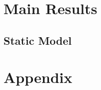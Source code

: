 \documentclass[aspectratio=169]{beamer}
\begin{document}
\section{Main Results}

\subsection{Static Model}
\begin{frame}
    \resizebox{30mm}{30mm}{
    }
\end{frame}



\appendix

\renewcommand\thetable{\thesection.\arabic{table}} 
\renewcommand\thefigure{\thesection.\arabic{figure}} 
\setcounter{table}{0}
\setcounter{figure}{0}

\section{Appendix}
\end{document}
